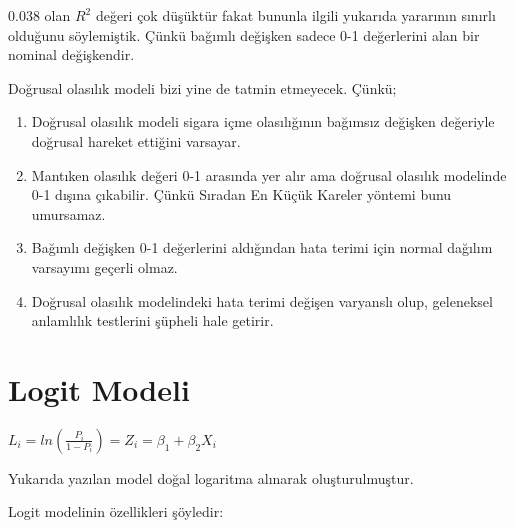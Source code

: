 \documentclass[
]{book}
\begin{document}
0.038 olan \(R^2\) değeri çok düşüktür fakat bununla ilgili yukarıda yararının sınırlı olduğunu söylemiştik. Çünkü bağımlı değişken sadece 0-1 değerlerini alan bir nominal değişkendir.

Doğrusal olasılık modeli bizi yine de tatmin etmeyecek. Çünkü;

\begin{enumerate}
\def\labelenumi{\roman{enumi}.}
\item
  Doğrusal olasılık modeli sigara içme olasılığının bağımsız değişken değeriyle doğrusal hareket ettiğini varsayar.
\item
  Mantıken olasılık değeri 0-1 arasında yer alır ama doğrusal olasılık modelinde 0-1 dışına çıkabilir. Çünkü Sıradan En Küçük Kareler yöntemi bunu umursamaz.
\item
  Bağımlı değişken 0-1 değerlerini aldığından hata terimi için normal dağılım varsayımı geçerli olmaz.
\item
  Doğrusal olasılık modelindeki hata terimi değişen varyanslı olup, geleneksel anlamlılık testlerini şüpheli hale getirir.
\end{enumerate}

\hypertarget{logit-modeli}{%
\section{Logit Modeli}\label{logit-modeli}}

\(L_i = ln(\frac{P_i}{1-P_i}) = Z_i = \beta_1 + \beta_2X_i\)

Yukarıda yazılan model doğal logaritma alınarak oluşturulmuştur.

Logit modelinin özellikleri şöyledir:
\end{document}
